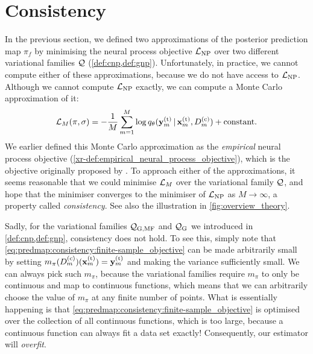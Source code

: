 \documentclass[12pt, twoside]{report}
\newcommand{\xrprefix}[1]{xr-#1}
\begin{document}
\section{Consistency}
\label{sec:predmap:consistency}

In the previous section, we defined two approximations of the posterior prediction map $\pi_f$ by minimising the neural process objective $\L\ss{NP}$ over two different variational families $\mathcal{Q}$ (\cref{def:cnp,def:gnp}).
Unfortunately, in practice, we cannot compute either of these approximations, because we do not have access to $\L\ss{NP}$.
Although we cannot compute $\L\ss{NP}$ exactly, we can compute a Monte Carlo approximation of it: 
\begin{equation} \label{eq:predmap:consistency:finite-sample_objective}
    \L_M(\pi, \sigma) = -\frac1M\sum_{m=1}^M \log q_\theta(\vy\us{(t)}_m \cond \vx\us{(t)}_m, D\us{(c)}_m) + \text{constant}.
\end{equation}
We earlier defined this Monte Carlo approximation as the \emph{empirical} neural process objective (\cref{\xrprefix{def:empirical_neural_process_objective}}),
which is the objective originally proposed by \textcite{Garnelo:2018:Conditional_Neural_Processes}.
To approach either of the approximations,
it seems reasonable that we could minimise $\mathcal{L}_M$ over the variational family $\mathcal{Q}$, and hope that the minimiser converges to the minimiser of $\L\ss{NP}$ as $M \to \infty$, a property called \emph{consistency}.
See also the illustration in \cref{fig:overview_theory}.

Sadly, for the variational families $\Qc\ss{G,MF}$ and $\Qc\ss{G}$ we introduced in \cref{def:cnp,def:gnp}, consistency does not hold.
To see this, simply note that \eqref{eq:predmap:consistency:finite-sample_objective} can be made arbitrarily small by setting $m_\pi(D\us{(c)}_m)(\vx_m\us{(t)}) = \vy_m\us{(t)}$ and making the variance sufficiently small.
We can always pick such $m_\pi$, because the variational families require $m_\pi$ to only be continuous and map to continuous functions, which means that we can arbitrarily choose the value of $m_\pi$ at any finite number of points.
What is essentially happening is that \eqref{eq:predmap:consistency:finite-sample_objective} is optimised over the collection of all continuous functions, which is too large, because a continuous function can always fit a data set exactly!
Consequently, our estimator will \emph{overfit}.
\end{document}
